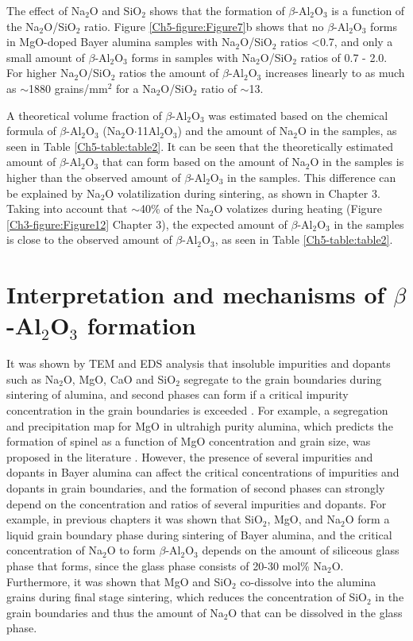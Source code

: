 The effect of Na$_{2}$O and SiO$_{2}$ shows that the formation of $\beta$-Al$_{2}$O$_{3}$ is a function of the Na$_{2}$O/SiO$_{2}$ ratio. Figure \ref{Ch5-figure:Figure7}b shows that no $\beta$-Al$_{2}$O$_{3}$ forms in MgO-doped Bayer alumina samples with Na$_{2}$O/SiO$_{2}$ ratios <0.7, and only a small amount of $\beta$-Al$_{2}$O$_{3}$ forms in samples with Na$_{2}$O/SiO$_{2}$ ratios of 0.7 - 2.0. For higher Na$_{2}$O/SiO$_{2}$ ratios the amount of $\beta$-Al$_{2}$O$_{3}$ increases linearly to as much as $\sim$1880 grains/mm$^{2}$ for a Na$_{2}$O/SiO$_{2}$ ratio of $\sim$13. 

A theoretical volume fraction of $\beta$-Al$_{2}$O$_{3}$ was estimated based on the chemical formula of $\beta$-Al$_{2}$O$_{3}$ (Na$_{2}$O$\cdot$11Al$_{2}$O$_{3}$) and the amount of Na$_{2}$O in the samples, as seen in Table \ref{Ch5-table:table2}. It can be seen that the theoretically estimated amount of $\beta$-Al$_{2}$O$_{3}$ that can form based on the amount of Na$_{2}$O in the samples is higher than the observed amount of $\beta$-Al$_{2}$O$_{3}$ in the samples. This difference can be explained by Na$_{2}$O volatilization during sintering, as shown in Chapter 3. Taking into account that $\sim$40\% of the Na$_{2}$O volatizes during heating (Figure \ref{Ch3-figure:Figure12} Chapter 3), the expected amount of $\beta$-Al$_{2}$O$_{3}$ in the samples is close to the observed amount of $\beta$-Al$_{2}$O$_{3}$, as seen in Table \ref{Ch5-table:table2}. 

\section{Interpretation and mechanisms of $\beta$-Al$_{2}$O$_{3}$ formation}
It was shown by TEM and EDS analysis that insoluble impurities and dopants such as Na$_{2}$O, MgO, CaO and SiO$_{2}$ segregate to the grain boundaries during sintering of alumina, and second phases can form if a critical impurity concentration in the grain boundaries is exceeded \cite{Zuo2013}. For example, a segregation and precipitation map for MgO in ultrahigh purity alumina, which predicts the formation of spinel as a function of MgO concentration and grain size, was proposed in the literature \cite{Zuo2013}. However, the presence of several impurities and dopants in Bayer alumina can affect the critical concentrations of impurities and dopants in grain boundaries, and the formation of second phases can strongly depend on the concentration and ratios of several impurities and dopants. For example, in previous chapters it was shown that SiO$_{2}$, MgO, and Na$_{2}$O form a liquid grain boundary phase during sintering of Bayer alumina, and the critical concentration of Na$_{2}$O to form $\beta$-Al$_{2}$O$_{3}$ depends on the amount of siliceous glass phase that forms, since the glass phase consists of 20-30 mol\% Na$_{2}$O. Furthermore, it was shown that MgO and SiO$_{2}$ co-dissolve into the alumina grains during final stage sintering, which reduces the concentration of SiO$_{2}$ in the grain boundaries and thus the amount of Na$_{2}$O that can be dissolved in the glass phase.

